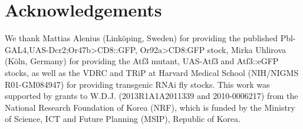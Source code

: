 \section*{Acknowledgements}

We thank Mattias Alenius (Link{\"{o}}ping, Sweden) for providing the published Pbl-GAL4,UAS-Dcr2;Or47b\textgreater{}CD8::GFP, Or92a\textgreater{}CD8:GFP stock, Mirka Uhlirova (K{\"{o}}ln, Germany) for providing the Atf3 mutant, UAS-Atf3 and Atf3::eGFP stocks, as well as the VDRC and TRiP at Harvard Medical School (NIH/NIGMS R01-GM084947) for providing transgenic RNAi fly stocks.
This work was supported by grants to W.D.J. (2013R1A1A2011339 and 2010-0006217) from the National Research Foundation of Korea (NRF), which is funded by the Ministry of Science, ICT and Future Planning (MSIP), Republic of Korea.